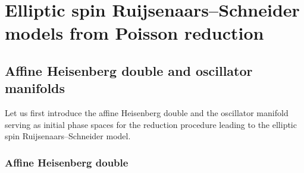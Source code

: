 \section{Elliptic spin Ruijsenaars--Schneider models from Poisson reduction}

\subsection{Affine Heisenberg double and oscillator manifolds}\label{sec:AffineHD_osc}
Let us first introduce the affine Heisenberg double and the oscillator manifold serving as initial phase spaces for the reduction procedure leading to the elliptic spin Ruijsenaars--Schneider model.

\subsubsection{Affine Heisenberg double}

